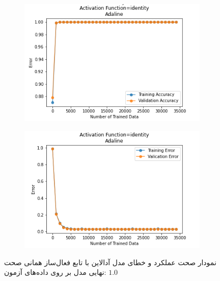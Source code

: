 \documentclass[12pt, a4paper]{article}
\begin{document}
\begin{figure}[!h]
    \begin{subfigure}{0.45\linewidth}
        \centering
        \includegraphics[width=\linewidth]{images/3/adaline/activation_func/identity_acc.png}
    \end{subfigure}
    \hfil
    \begin{subfigure}{0.45\linewidth}
        \centering
        \includegraphics[width=\linewidth]{images/3/adaline/activation_func/identity_error.png}
    \end{subfigure}
    \caption{نمودار صحت عملکرد‌ و خطای مدل آدالاین با تابع فعال‌ساز همانی
    \newline
    صحت نهایی مدل بر روی داده‌های آزمون: $1.0$}
\end{figure}

\clearpage
\end{document}
